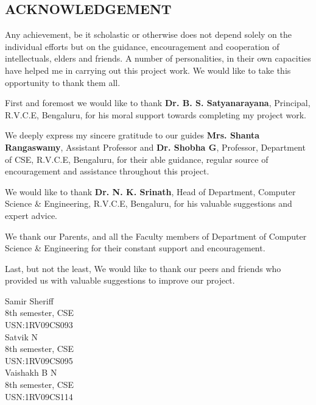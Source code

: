 \documentclass[12pt]{report}
\begin{document}
  
\setcounter{page}{1}
\begin{center}
\section*{ACKNOWLEDGEMENT}
\end{center}
Any achievement, be it scholastic or otherwise does not depend solely on the individual efforts but on the guidance, encouragement and cooperation of intellectuals, elders and friends. A number of personalities, in their own capacities have helped me in carrying out this project work. We would like to take this opportunity to thank them all.

First and foremost we would like to thank \textbf{Dr. B. S. Satyanarayana}, Principal, R.V.C.E, Bengaluru, for his moral support towards completing my project work.

We deeply express my sincere gratitude to our guides \textbf{Mrs. Shanta Rangaswamy}, Assistant Professor and \textbf{Dr. Shobha G}, Professor, Department of CSE, R.V.C.E, Bengaluru, for their able guidance, regular source of encouragement and assistance throughout this project. 

We would like to thank \textbf{Dr. N. K. Srinath}, Head of Department, Computer Science \& Engineering, R.V.C.E, Bengaluru, for his valuable suggestions and expert advice.

We thank our Parents, and all the Faculty members of Department of Computer Science \& Engineering for their constant support and encouragement.

Last, but not the least, We would like to thank our peers and friends who provided us with valuable suggestions to improve our project.
\begin{flushright}
Samir Sheriff\\
8th semester, CSE\\
USN:1RV09CS093\\

Satvik N\\
8th semester, CSE\\
USN:1RV09CS095\\

Vaishakh B N\\ 
8th semester, CSE\\
USN:1RV09CS114\\

\end{flushright}
\end{document}
